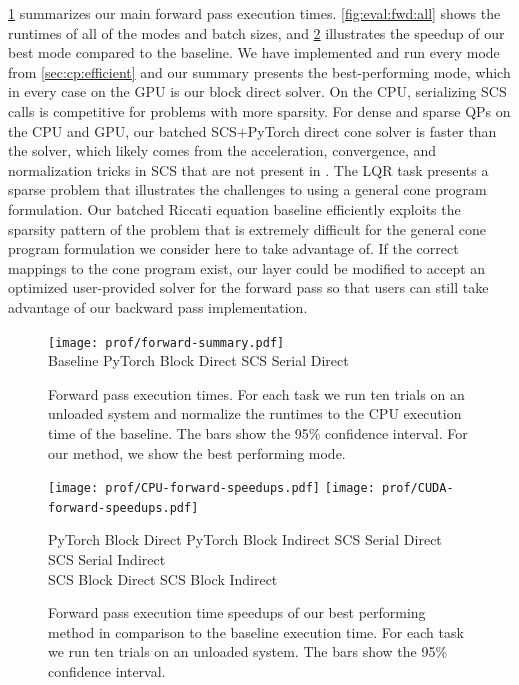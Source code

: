 \cref{fig:eval:fwd} summarizes our main forward pass execution
times. \cref{fig:eval:fwd:all} shows the runtimes of all of the
modes and batch sizes, and \cref{fig:eval:fwd:speedups}
illustrates the speedup of our best mode compared to the baseline.
We have implemented and run every mode from \cref{sec:cp:efficient}
and our summary presents the best-performing mode,
which in every case on the GPU is our block direct solver.
On the CPU, serializing SCS calls is competitive for
problems with more sparsity.
For dense and sparse QPs on the CPU and GPU, our batched
SCS+PyTorch direct cone solver is faster than
the \qpth solver, which likely comes from the
acceleration, convergence, and normalization
tricks in SCS that are not present in \qpth.
The LQR task presents a sparse problem that illustrates
the challenges to using a general cone program formulation.
Our batched Riccati equation baseline efficiently exploits
the sparsity pattern of the problem that is extremely
difficult for the general cone program formulation we
consider here to take advantage of.
If the correct mappings to the cone program exist,
our layer could be modified to accept an
optimized user-provided solver for the forward pass
so that users can still take advantage of our backward
pass implementation.


\begin{figure}[t]
  \centering
  \texttt{[image: prof/forward-summary.pdf]} \\
   Baseline \enskip
   PyTorch Block Direct \enskip
   SCS Serial Direct
  \caption{
    Forward pass execution times.
    For each task we run ten trials
    on an unloaded system and normalize the runtimes to the
    CPU execution time of the baseline.
    The bars show the 95\% confidence interval.
    For our method, we show the best performing mode.
  }
  \label{fig:eval:fwd}
\end{figure}


\begin{figure}[!h]
  \centering
  \texttt{[image: prof/CPU-forward-speedups.pdf]}
  \texttt{[image: prof/CUDA-forward-speedups.pdf]}

   PyTorch Block Direct \enskip
   PyTorch Block Indirect \enskip
   SCS Serial Direct \enskip
   SCS Serial Indirect \\
   SCS Block Direct \enskip
   SCS Block Indirect

  \caption{
    Forward pass execution time speedups of our best
    performing method in comparison to the baseline execution time.
    For each task we run ten trials on an unloaded system.
    The bars show the 95\% confidence interval.
  }
  \label{fig:eval:fwd:speedups}
\end{figure}

